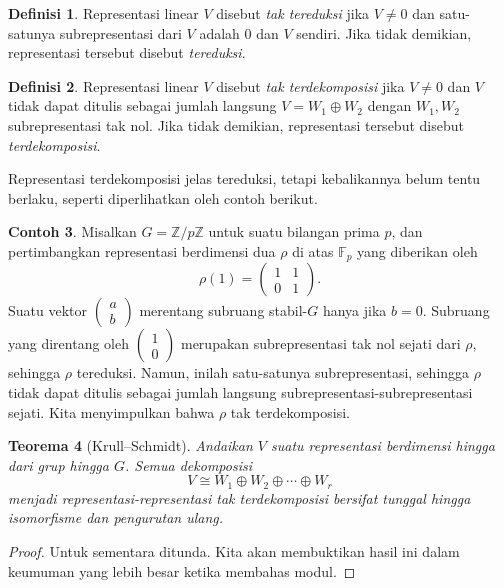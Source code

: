\documentclass[12pt]{article}
\theoremstyle{plain}
\newtheorem{theorem}{Teorema}[section]
\theoremstyle{definition}
\newtheorem{definition}[theorem]{Definisi}
\newtheorem{example}[theorem]{Contoh}
\theoremstyle{remark}
\numberwithin{equation}{section}
\begin{document}
\begin{definition}
Representasi linear $V$ disebut \emph{tak tereduksi} jika $V \ne 0$ dan satu-satunya
subrepresentasi dari $V$ adalah $0$ dan $V$ sendiri.
Jika tidak demikian, representasi tersebut disebut \emph{tereduksi}.
\end{definition}

\begin{definition}
Representasi linear $V$ disebut \emph{tak terdekomposisi} jika $V \ne 0$ dan
$V$ tidak dapat ditulis sebagai jumlah langsung $V = W_1 \oplus W_2$ dengan
$W_1, W_2$ subrepresentasi tak nol.
Jika tidak demikian, representasi tersebut disebut \emph{terdekomposisi}.
\end{definition}

Representasi terdekomposisi jelas tereduksi, tetapi kebalikannya
belum tentu berlaku, seperti diperlihatkan oleh contoh berikut.

\begin{example}
Misalkan $G=\mathbb{Z}/p\mathbb{Z}$ untuk suatu bilangan prima $p$,
dan pertimbangkan representasi berdimensi dua $\rho$ di atas $\mathbb{F}_p$
yang diberikan oleh
\[
\rho(1) = \begin{pmatrix} 1&1\\0&1 \end{pmatrix} .
\]
Suatu vektor $\begin{pmatrix} a\\b \end{pmatrix} $ merentang
subruang stabil-$G$ hanya jika $b=0$.
Subruang yang direntang oleh $\begin{pmatrix} 1\\0 \end{pmatrix}$
merupakan subrepresentasi tak nol sejati
dari $\rho$, sehingga $\rho$ tereduksi.
Namun, inilah satu-satunya subrepresentasi, sehingga $\rho$
tidak dapat ditulis sebagai jumlah langsung subrepresentasi-subrepresentasi sejati.
Kita menyimpulkan bahwa $\rho$ tak terdekomposisi.
\end{example}

\begin{theorem}[Krull--Schmidt]
Andaikan $V$ suatu representasi berdimensi hingga dari grup hingga $G$.
Semua dekomposisi
\[
V \cong W_1 \oplus W_2 \oplus \cdots \oplus W_r
\]
menjadi representasi-representasi tak terdekomposisi bersifat tunggal hingga isomorfisme
dan pengurutan ulang.
\end{theorem}

\begin{proof}
Untuk sementara ditunda. Kita akan membuktikan hasil ini dalam keumuman yang lebih besar ketika membahas
modul.
\end{proof}
\end{document}
